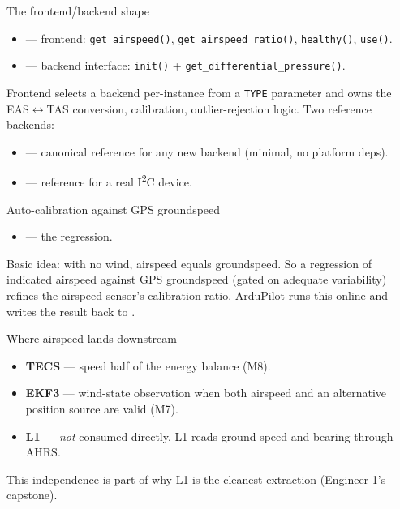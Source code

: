 \documentclass[aspectratio=169,11pt]{beamer}
\begin{document}
\begin{frame}{The frontend/backend shape}
  \begin{itemize}
    \item {} --- frontend: \texttt{get\_airspeed()}, \texttt{get\_airspeed\_ratio()}, \texttt{healthy()}, \texttt{use()}.
    \item {} --- backend interface: \texttt{init()} + \texttt{get\_differential\_pressure()}.
  \end{itemize}
  \vfill
  Frontend selects a backend per-instance from a \texttt{TYPE} parameter and owns the EAS$\leftrightarrow$TAS conversion, calibration, outlier-rejection logic.
  \vfill
  Two reference backends:
  \begin{itemize}
    \item {} --- canonical reference for any new backend (minimal, no platform deps).
    \item {} --- reference for a real I\textsuperscript{2}C device.
  \end{itemize}
\end{frame}

\begin{frame}{Auto-calibration against GPS groundspeed}
  \begin{itemize}
    \item {} --- the regression.
  \end{itemize}
  \vfill
  Basic idea: with no wind, airspeed equals groundspeed. So a regression of indicated airspeed against GPS groundspeed (gated on adequate variability) refines the airspeed sensor's calibration ratio.
  \vfill
  ArduPilot runs this online and writes the result back to .
\end{frame}

\begin{frame}{Where airspeed lands downstream}
  \begin{itemize}
    \item \textbf{TECS} --- speed half of the energy balance (M8).
    \item \textbf{EKF3} --- wind-state observation when both airspeed and an alternative position source are valid (M7).
    \item \textbf{L1} --- \emph{not} consumed directly. L1 reads ground speed and bearing through AHRS.
  \end{itemize}
  \vfill
  This independence is part of why L1 is the cleanest extraction (Engineer 1's capstone).
\end{frame}
\end{document}
